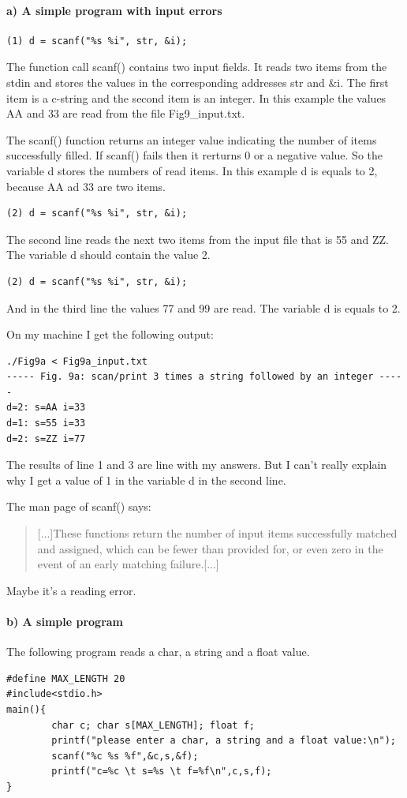 \documentclass[12pt]{article}
\begin{document}
\paragraph*{a) A simple program with input errors}
\quad
\begin{lstlisting}
(1) d = scanf("%s %i", str, &i);
\end{lstlisting}
The function call scanf() contains two input fields. It reads two items from the stdin and stores the values in the corresponding addresses str and \&i. The first item is a c-string and the second item is an integer. In this example the values AA and 33 are read from the file Fig9\_input.txt.

The scanf() function returns an integer value indicating the number of items successfully filled. If scanf() fails then  it rerturns 0 or a negative value. So the variable d stores the numbers of read items. In this example d is equals to 2, because AA ad 33 are two items.

\begin{lstlisting}
(2) d = scanf("%s %i", str, &i);
\end{lstlisting}
The second line reads the next two items from the input file that is 55 and ZZ. The variable d should contain the value 2.

\begin{lstlisting}
(2) d = scanf("%s %i", str, &i);
\end{lstlisting}
And in the third line the values 77 and 99 are read. The variable d is equals to 2.

On my machine I get the following output:
\begin{lstlisting}
./Fig9a < Fig9a_input.txt
----- Fig. 9a: scan/print 3 times a string followed by an integer -----
d=2: s=AA i=33
d=1: s=55 i=33
d=2: s=ZZ i=77

\end{lstlisting}
The results of line 1 and 3 are line with my answers. But I can't really explain why I get a value of 1 in the variable d in the second line. 

The man page of scanf() says:
\begin{quote}
[...]These functions return the number of input items  successfully  matched and assigned, which can be fewer than provided for, or even zero in the event of an early matching failure.[...]
\end{quote}
Maybe it's a reading error.

\paragraph*{b) A simple program}
The following program reads a char, a string and a float value.
\begin{lstlisting}
#define MAX_LENGTH 20
#include<stdio.h>
main(){
        char c; char s[MAX_LENGTH]; float f;
        printf("please enter a char, a string and a float value:\n");
        scanf("%c %s %f",&c,s,&f);
        printf("c=%c \t s=%s \t f=%f\n",c,s,f);
}
\end{lstlisting}
\end{document}
